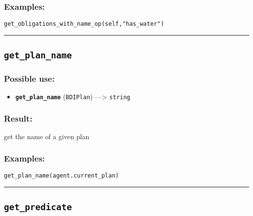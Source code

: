 \documentclass[]{book}
\providecommand{\tightlist}{%
  \setlength{\itemsep}{0pt}\setlength{\parskip}{0pt}}
\theoremstyle{definition}
\theoremstyle{definition}
\theoremstyle{definition}
\theoremstyle{remark}
\begin{document}
\subsubsection{Examples:}\label{examples-171}

\begin{verbatim}
get_obligations_with_name_op(self,"has_water") 
\end{verbatim}

\begin{center}\rule{0.5\linewidth}{\linethickness}\end{center}

\subsection{\texorpdfstring{\texttt{get\_plan\_name}}{get\_plan\_name}}\label{get_plan_name}

\subsubsection{Possible use:}\label{possible-use-225}

\begin{itemize}
\tightlist
\item
  \textbf{\texttt{get\_plan\_name}} (\texttt{BDIPlan}) ---\textgreater{}
  \texttt{string}
\end{itemize}

\subsubsection{Result:}\label{result-219}

get the name of a given plan

\subsubsection{Examples:}\label{examples-172}

\begin{verbatim}
get_plan_name(agent.current_plan) 
\end{verbatim}

\begin{center}\rule{0.5\linewidth}{\linethickness}\end{center}

\subsection{\texorpdfstring{\texttt{get\_predicate}}{get\_predicate}}\label{get_predicate}
\end{document}
